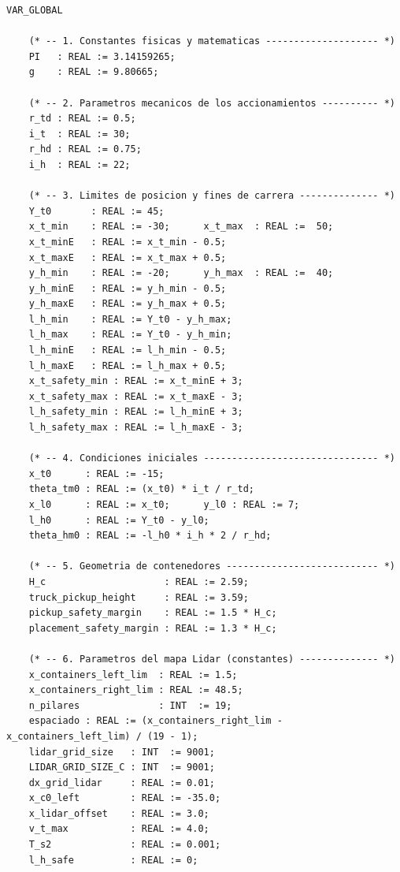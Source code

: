 \documentclass[12pt, a4paper]{article}
\begin{document}
\begin{lstlisting}[style=st, basicstyle=\ttfamily\scriptsize,
    caption={Variables globales (\texttt{GVL}) del proyecto CODESYS, organizadas por grupo funcional.},
    label=lst:gvl]
VAR_GLOBAL

    (* -- 1. Constantes fisicas y matematicas -------------------- *)
    PI   : REAL := 3.14159265;
    g    : REAL := 9.80665;

    (* -- 2. Parametros mecanicos de los accionamientos ---------- *)
    r_td : REAL := 0.5;
    i_t  : REAL := 30;
    r_hd : REAL := 0.75;
    i_h  : REAL := 22;

    (* -- 3. Limites de posicion y fines de carrera -------------- *)
    Y_t0       : REAL := 45;
    x_t_min    : REAL := -30;      x_t_max  : REAL :=  50;
    x_t_minE   : REAL := x_t_min - 0.5;
    x_t_maxE   : REAL := x_t_max + 0.5;
    y_h_min    : REAL := -20;      y_h_max  : REAL :=  40;
    y_h_minE   : REAL := y_h_min - 0.5;
    y_h_maxE   : REAL := y_h_max + 0.5;
    l_h_min    : REAL := Y_t0 - y_h_max;
    l_h_max    : REAL := Y_t0 - y_h_min;
    l_h_minE   : REAL := l_h_min - 0.5;
    l_h_maxE   : REAL := l_h_max + 0.5;
    x_t_safety_min : REAL := x_t_minE + 3;
    x_t_safety_max : REAL := x_t_maxE - 3;
    l_h_safety_min : REAL := l_h_minE + 3;
    l_h_safety_max : REAL := l_h_maxE - 3;

    (* -- 4. Condiciones iniciales ------------------------------- *)
    x_t0      : REAL := -15;
    theta_tm0 : REAL := (x_t0) * i_t / r_td;
    x_l0      : REAL := x_t0;      y_l0 : REAL := 7;
    l_h0      : REAL := Y_t0 - y_l0;
    theta_hm0 : REAL := -l_h0 * i_h * 2 / r_hd;

    (* -- 5. Geometria de contenedores --------------------------- *)
    H_c                     : REAL := 2.59;
    truck_pickup_height     : REAL := 3.59;
    pickup_safety_margin    : REAL := 1.5 * H_c;
    placement_safety_margin : REAL := 1.3 * H_c;

    (* -- 6. Parametros del mapa Lidar (constantes) -------------- *)
    x_containers_left_lim  : REAL := 1.5;
    x_containers_right_lim : REAL := 48.5;
    n_pilares              : INT  := 19;
    espaciado : REAL := (x_containers_right_lim - x_containers_left_lim) / (19 - 1);
    lidar_grid_size   : INT  := 9001;
    LIDAR_GRID_SIZE_C : INT  := 9001;
    dx_grid_lidar     : REAL := 0.01;
    x_c0_left         : REAL := -35.0;
    x_lidar_offset    : REAL := 3.0;
    v_t_max           : REAL := 4.0;
    T_s2              : REAL := 0.001;
    l_h_safe          : REAL := 0;


\end{lstlisting}
\end{document}

